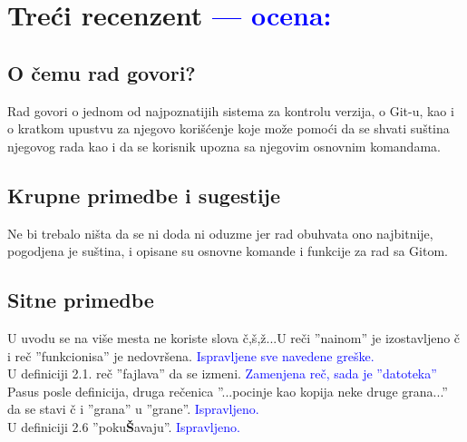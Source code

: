 \documentclass[a4paper]{report}
\newcommand{\odgovor}[1]{\textcolor{blue}{#1}}
\begin{document}
\chapter{Treći recenzent \odgovor{--- ocena:} }

\section{O čemu rad govori?}
Rad govori o jednom od najpoznatijih sistema za kontrolu verzija, o Git-u, kao i o kratkom upustvu za njegovo korišćenje koje može pomoći da se shvati suština njegovog rada kao i da se korisnik upozna sa njegovim osnovnim komandama.

\section{Krupne primedbe i sugestije}
Ne bi trebalo ništa da se ni doda ni oduzme jer rad obuhvata ono najbitnije, pogodjena je suština, i opisane su osnovne komande i funkcije za rad sa Gitom.


\section{Sitne primedbe}
U uvodu se na više mesta ne koriste slova č,š,ž...U reči ''nainom'' je izostavljeno č i reč ''funkcionisa'' je nedovršena.\newline
\odgovor{Ispravljene sve navedene greške.}\\

U definiciji 2.1. reč ''fajlava'' da se izmeni.\newline
\odgovor{Zamenjena reč, sada je ''datoteka''}\\

Pasus posle definicija, druga rečenica ''...pocinje kao kopija neke druge grana...'' da se stavi č i ''grana'' u ''grane''.\newline
\odgovor{Ispravljeno.}\\

U definiciji 2.6 ''poku\textbf{Š}avaju''.\newline
\odgovor{Ispravljeno.}\\
\end{document}
